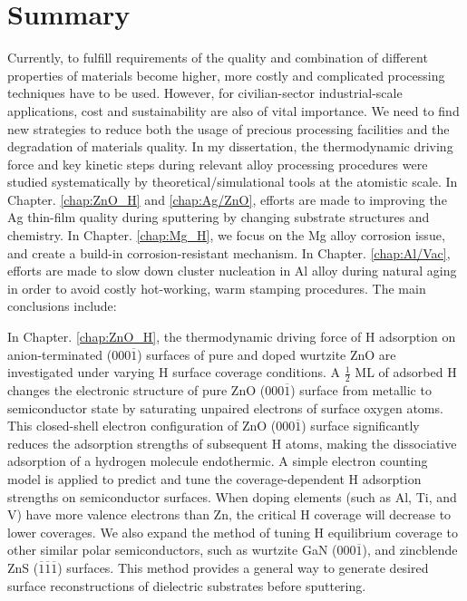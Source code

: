 \section{Summary}

Currently, to fulfill requirements of the quality and combination of different properties of materials become higher, more costly and complicated processing techniques have to be used. However, for civilian-sector industrial-scale applications, cost and sustainability are also of vital importance. We need to find new strategies to reduce both the usage of precious processing facilities and the degradation of materials quality. In my dissertation, the thermodynamic driving force and key kinetic steps during relevant alloy processing procedures were studied systematically by theoretical/simulational tools at the atomistic scale. In Chapter. \ref{chap:ZnO_H} and \ref{chap:Ag/ZnO}, efforts are made to improving the Ag thin-film quality during sputtering by changing substrate structures and chemistry. In Chapter. \ref{chap:Mg_H}, we focus on the Mg alloy corrosion issue, and create a build-in corrosion-resistant mechanism.
In Chapter. \ref{chap:Al/Vac}, efforts are made to slow down cluster nucleation in Al alloy during natural aging in order to avoid costly hot-working, warm stamping procedures. The main conclusions include:

In Chapter. \ref{chap:ZnO_H}, the thermodynamic driving force of H adsorption on anion-terminated (000$\overline{1}$) surfaces of pure and doped wurtzite ZnO are investigated under varying H surface coverage conditions. A $\frac{1}{2}$ \ac{ML} of adsorbed H changes the electronic structure of pure ZnO (000$\overline{1}$) surface from metallic to semiconductor state by saturating unpaired electrons of surface oxygen atoms. This closed-shell electron configuration of ZnO (000$\overline{1}$) surface significantly reduces the adsorption strengths of subsequent H atoms, making the dissociative adsorption of a hydrogen molecule endothermic. A simple electron counting model is applied to predict and tune the coverage-dependent H adsorption strengths on semiconductor surfaces. When doping elements (such as Al, Ti, and V) have more valence electrons than Zn, the critical H coverage will decrease to lower coverages. We also expand the method of tuning H equilibrium coverage to other similar polar semiconductors, such as wurtzite GaN (000$\overline{1}$), and zincblende ZnS ($\overline{1}$$\overline{1}$$\overline{1}$) surfaces. This method provides a general way to generate desired surface reconstructions of dielectric substrates before sputtering.

